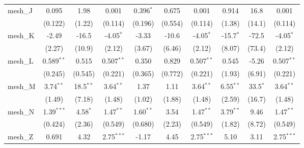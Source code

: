 \begin{tabular}{lccccccccc}
   mesh\_J                                                     & 0.095          & 1.98           & 0.001          & 0.396$^{*}$   & 0.675          & 0.001          & 0.914         & 16.8         & 0.001\\   
                                                               & (0.122)        & (1.22)         & (0.114)        & (0.196)       & (0.554)        & (0.114)        & (1.38)        & (14.1)       & (0.114)\\   
   mesh\_K                                                     & -2.49          & -16.5          & -4.05$^{*}$    & -3.33         & -10.6          & -4.05$^{*}$    & -15.7$^{*}$   & -72.5        & -4.05$^{*}$\\   
                                                               & (2.27)         & (10.9)         & (2.12)         & (3.67)        & (6.46)         & (2.12)         & (8.07)        & (73.4)       & (2.12)\\   
   mesh\_L                                                     & 0.589$^{**}$   & 0.515          & 0.507$^{**}$   & 0.350         & 0.829          & 0.507$^{**}$   & 0.545         & -5.26        & 0.507$^{**}$\\   
                                                               & (0.245)        & (0.545)        & (0.221)        & (0.365)       & (0.772)        & (0.221)        & (1.93)        & (6.91)       & (0.221)\\   
   mesh\_M                                                     & 3.74$^{**}$    & 18.5$^{**}$    & 3.64$^{**}$    & 1.37          & 1.11           & 3.64$^{**}$    & 6.55$^{**}$   & 33.5$^{*}$   & 3.64$^{**}$\\   
                                                               & (1.49)         & (7.18)         & (1.48)         & (1.02)        & (1.88)         & (1.48)         & (2.59)        & (16.7)       & (1.48)\\   
   mesh\_N                                                     & 1.39$^{***}$   & 4.58$^{*}$     & 1.47$^{**}$    & 1.60$^{**}$   & 3.54           & 1.47$^{**}$    & 3.79$^{**}$   & 9.46         & 1.47$^{**}$\\   
                                                               & (0.424)        & (2.36)         & (0.549)        & (0.680)       & (2.23)         & (0.549)        & (1.82)        & (8.72)       & (0.549)\\   
   mesh\_Z                                                     & 0.691          & 4.32           & 2.75$^{***}$   & -1.17         & 4.45           & 2.75$^{***}$   & 5.10          & 3.11         & 2.75$^{***}$\\   

\end{tabular}
